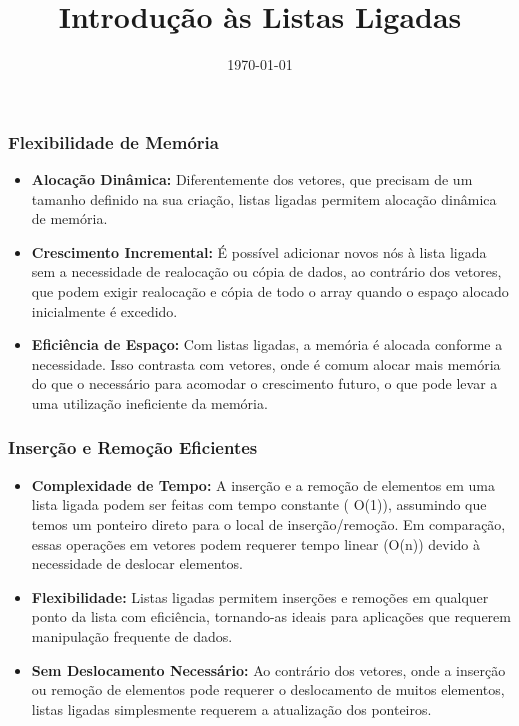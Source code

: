 \title{Introdução às Listas Ligadas}
\date{\today}
\frame{\titlepage}

\begin{frame}[fragile]
  \frametitle{Flexibilidade de Memória}
  \begin{itemize}
  \item \textbf{Alocação Dinâmica:} Diferentemente dos vetores, que precisam de um tamanho definido na sua criação, listas ligadas permitem alocação dinâmica de memória.
  \item \textbf{Crescimento Incremental:} É possível adicionar novos nós à lista ligada sem a necessidade de realocação ou cópia de dados, ao contrário dos vetores, que podem exigir realocação e cópia de todo o array quando o espaço alocado inicialmente é excedido.
  \item \textbf{Eficiência de Espaço:} Com listas ligadas, a memória é alocada conforme a necessidade. Isso contrasta com vetores, onde é comum alocar mais memória do que o necessário para acomodar o crescimento futuro, o que pode levar a uma utilização ineficiente da memória.
  \end{itemize}
  \end{frame}
  
  \begin{frame}[fragile]
  \frametitle{Inserção e Remoção Eficientes}
  \begin{itemize}
  \item \textbf{Complexidade de Tempo:} A inserção e a remoção de elementos em uma lista ligada podem ser feitas com tempo constante ( O(1)), assumindo que temos um ponteiro direto para o local de inserção/remoção. Em comparação, essas operações em vetores podem requerer tempo linear (O(n)) devido à necessidade de deslocar elementos.
  \item \textbf{Flexibilidade:} Listas ligadas permitem inserções e remoções em qualquer ponto da lista com eficiência, tornando-as ideais para aplicações que requerem manipulação frequente de dados.
  \item \textbf{Sem Deslocamento Necessário:} Ao contrário dos vetores, onde a inserção ou remoção de elementos pode requerer o deslocamento de muitos elementos, listas ligadas simplesmente requerem a atualização dos ponteiros.
  \end{itemize}
  \end{frame}
  
